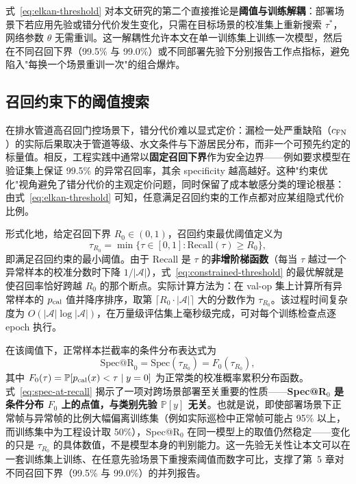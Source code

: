 \documentclass[UTF8,openany,12pt]{ctexbook}
\begin{document}
式~\eqref{eq:elkan-threshold} 对本文研究的第二个直接推论是\textbf{阈值与训练解耦}：部署场景下若应用先验或错分代价发生变化，只需在目标场景的校准集上重新搜索 $\tau^{\ast}$，网络参数 $\theta$ 无需重训。这一解耦性允许本文在单一训练集上训练一次模型，然后在不同召回下界（99.5\% 与 99.0\%）或不同部署先验下分别报告工作点指标，避免陷入"每换一个场景重训一次"的组合爆炸。

\subsection{召回约束下的阈值搜索}
在排水管道高召回门控场景下，错分代价难以显式定价：漏检一处严重缺陷（$c_{\rm FN}$）的实际后果取决于管道等级、水文条件与下游居民分布，而非一个可预先约定的标量值。相反，工程实践中通常以\textbf{固定召回下界}作为安全边界——例如要求模型在验证集上保证 99.5\% 的异常召回率，其余 specificity 越高越好。这种"约束优化"视角避免了错分代价的主观定价问题，同时保留了成本敏感分类的理论根基：由式~\eqref{eq:elkan-threshold} 可知，任意满足召回约束的工作点都对应某组隐式代价比例。

形式化地，给定召回下界 $R_0 \in (0, 1)$，召回约束最优阈值定义为
\begin{equation}
\tau_{R_0} = \min\bigl\{\tau \in [0, 1] : \mathrm{Recall}(\tau) \geq R_0\bigr\},
\label{eq:constrained-threshold}
\end{equation}
即满足召回约束的最小阈值。由于 Recall 是 $\tau$ 的\textbf{非增阶梯函数}（每当 $\tau$ 越过一个异常样本的校准分数时下降 $1/|\mathcal{A}|$），式~\eqref{eq:constrained-threshold} 的最优解就是使召回率恰好跨越 $R_0$ 的那个断点。实际计算方法为：在 val-op 集上计算所有异常样本的 $p_{\rm cal}$ 值并降序排序，取第 $\lceil R_0 \cdot |\mathcal{A}| \rceil$ 大的分数作为 $\tau_{R_0}$。该过程时间复杂度为 $O(|\mathcal{A}|\log|\mathcal{A}|)$，在万量级评估集上毫秒级完成，可对每个训练检查点逐 epoch 执行。

在该阈值下，正常样本拦截率的条件分布表达式为
\begin{equation}
\mathrm{Spec@R}_0 = \mathrm{Spec}(\tau_{R_0}) = F_0(\tau_{R_0}),
\label{eq:spec-at-recall}
\end{equation}
其中 $F_0(\tau) = \mathbb{P}[p_{\rm cal}(x) < \tau \mid y = 0]$ 为正常类的校准概率累积分布函数。式~\eqref{eq:spec-at-recall} 揭示了一项对跨场景部署至关重要的性质——\textbf{Spec@R$_0$ 是条件分布 $F_0$ 上的点值，与类别先验 $\mathbb{P}[y]$ 无关}。也就是说，即使部署场景下正常帧与异常帧的比例大幅偏离训练集（例如实际巡检中正常帧可能占 95\% 以上，而训练集中为工程设计取 50\%），Spec@R$_0$ 在同一模型上的取值仍然稳定——变化的只是 $\tau_{R_0}$ 的具体数值，不是模型本身的判别能力。这一先验无关性让本文可以在一套训练集上训练、在任意先验场景下重搜索阈值而数字可比，支撑了第~5 章对不同召回下界（99.5\% 与 99.0\%）的并列报告。
\end{document}
